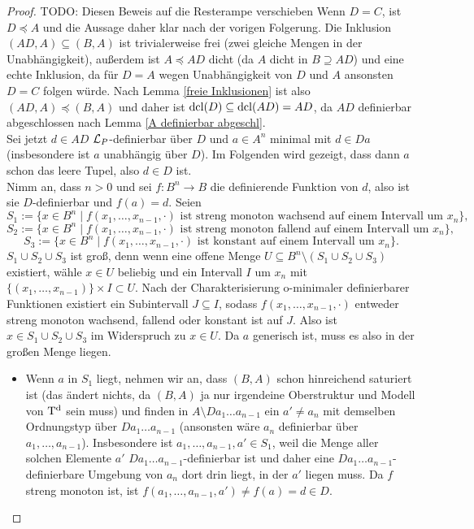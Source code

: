 \begin{proof}
	TODO: Diesen Beweis auf die Resterampe verschieben
	Wenn $D=C$, ist $D\preceq A$ und die Aussage daher klar nach der vorigen Folgerung. Die Inklusion $(AD,A)\subseteq(B,A)$ ist trivialerweise frei (zwei gleiche Mengen in der Unabhängigkeit), außerdem ist $A\preceq AD$ dicht (da $A$ dicht in $B\supseteq AD$) und eine echte Inklusion, da für $D=A$ wegen Unabhängigkeit von $D$ und $A$ ansonsten $D=C$ folgen würde. Nach Lemma \ref{freie Inklusionen} ist also $(AD,A)\preceq(B,A)$ und daher ist $\operatorname{dcl}(D)\subseteq\operatorname{dcl}(AD)=AD$, da $AD$ definierbar abgeschlossen nach Lemma \ref{A definierbar abgeschl}.\\
	Sei jetzt $d\in AD$ $\mathcal{L}_P$-definierbar über $D$ und $a\in A^n$ minimal mit $d\in Da$ (insbesondere ist $a$ unabhängig über $D$). Im Folgenden wird gezeigt, dass dann $a$ schon das leere Tupel, also $d\in D$ ist.\\
	Nimm an, dass $n>0$ und sei $f:B^n\rightarrow B$ die definierende Funktion von $d$, also ist sie $D$-definierbar und $f(a)=d$. Seien $$S_1:=\{x\in B^n\mid f(x_1,\dots,x_{n-1},\cdot)\text{ ist streng monoton wachsend auf einem Intervall um }x_n\},$$ $$S_2:=\{x\in B^n\mid f(x_1,\dots,x_{n-1},\cdot)\text{ ist streng monoton fallend auf einem Intervall um }x_n\},$$ $$S_3:=\{x\in B^n\mid f(x_1,\dots,x_{n-1},\cdot)\text{ ist konstant auf einem Intervall um }x_n\}.$$
	$S_1\cup S_2\cup S_3$ ist groß, denn wenn eine offene Menge $U\subseteq B^n\setminus(S_1\cup S_2\cup S_3)$ existiert, wähle $x\in U$ beliebig und ein Intervall $I$ um $x_n$ mit $\{(x_1,\dots,x_{n-1})\}\times I\subset U$. Nach der Charakterisierung o-minimaler definierbarer Funktionen existiert ein Subintervall $J\subseteq I$, sodass $f(x_1,\dots,x_{n-1},\cdot)$ entweder streng monoton wachsend, fallend oder konstant ist auf $J$. Also ist $x\in S_1\cup S_2\cup S_3$ im Widerspruch zu $x\in U$.\newpage
	Da $a$ generisch ist, muss es also in der großen Menge liegen.
	\begin{itemize}
		\item Wenn $a$ in $S_1$ liegt, nehmen wir an, dass $(B,A)$ schon hinreichend saturiert ist (das ändert nichts, da $(B,A)$ ja nur irgendeine Oberstruktur und Modell von $\operatorname{T^d}$ sein muss) und finden in $A\setminus Da_1\dots a_{n-1}$ ein $a'\neq a_n$ mit demselben Ordnungstyp über $Da_1\dots a_{n-1}$ (ansonsten wäre $a_n$ definierbar über $a_1,\dots,a_{n-1}$). Insbesondere ist $a_1,\dots,a_{n-1},a'\in S_1$, weil die Menge aller solchen Elemente $a'$ $Da_1\dots a_{n-1}$-definierbar ist und daher eine $Da_1\dots a_{n-1}$-definierbare Umgebung von $a_n$ dort drin liegt, in der $a'$ liegen muss. Da $f$ streng monoton ist, ist $f(a_1,\dots,a_{n-1},a')\neq f(a)=d\in D$.\\

\end{itemize}
\end{proof}
